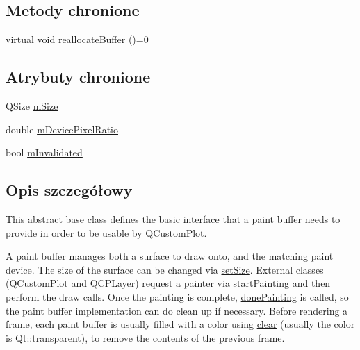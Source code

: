 \subsection*{Metody chronione}
\begin{DoxyCompactItemize}
\item 
virtual void \hyperlink{class_q_c_p_abstract_paint_buffer_aee7506a52bd7e5a07c2af27935eb13e7}{reallocate\+Buffer} ()=0
\end{DoxyCompactItemize}
\subsection*{Atrybuty chronione}
\begin{DoxyCompactItemize}
\item 
Q\+Size \hyperlink{class_q_c_p_abstract_paint_buffer_ae246c426222bfa18d5e8797fab73e3ce}{m\+Size}
\item 
double \hyperlink{class_q_c_p_abstract_paint_buffer_a33c1fd784478441fcff9ebf3d69af5b2}{m\+Device\+Pixel\+Ratio}
\item 
bool \hyperlink{class_q_c_p_abstract_paint_buffer_a3bc49cc9cf9daaca3a60977f010c08c9}{m\+Invalidated}
\end{DoxyCompactItemize}


\subsection{Opis szczegółowy}
This abstract base class defines the basic interface that a paint buffer needs to provide in order to be usable by \hyperlink{class_q_custom_plot}{Q\+Custom\+Plot}.

A paint buffer manages both a surface to draw onto, and the matching paint device. The size of the surface can be changed via \hyperlink{class_q_c_p_abstract_paint_buffer_a8b68c3cd36533f1a4a23b5ce8cd66f01}{set\+Size}. External classes (\hyperlink{class_q_custom_plot}{Q\+Custom\+Plot} and \hyperlink{class_q_c_p_layer}{Q\+C\+P\+Layer}) request a painter via \hyperlink{class_q_c_p_abstract_paint_buffer_a9e9f29b19c033cf02fb96f1a148463f3}{start\+Painting} and then perform the draw calls. Once the painting is complete, \hyperlink{class_q_c_p_abstract_paint_buffer_a41b0dc6e7744f19fae09f8532c207dc1}{done\+Painting} is called, so the paint buffer implementation can do clean up if necessary. Before rendering a frame, each paint buffer is usually filled with a color using \hyperlink{class_q_c_p_abstract_paint_buffer_a9e253f4541dfc01992b77e8830bd7722}{clear} (usually the color is {\ttfamily Qt\+::transparent}), to remove the contents of the previous frame.

